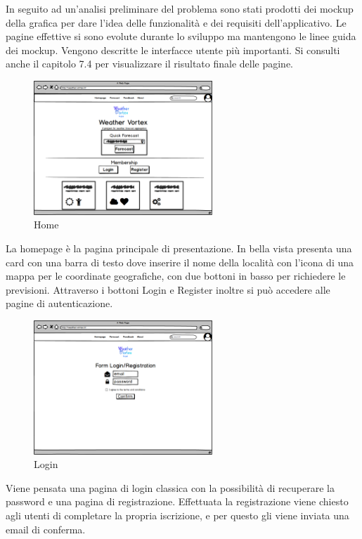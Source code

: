 In seguito ad un'analisi preliminare del problema sono stati prodotti dei mockup
della grafica per dare l'idea delle funzionalità e dei requisiti dell'applicativo. Le
pagine effettive si sono evolute durante lo sviluppo ma mantengono le linee guida
dei mockup. 
Vengono descritte le interfacce utente più importanti.
Si consulti anche il capitolo 7.4 per visualizzare il risultato finale delle pagine.
\begin{figure}[H]
    \caption{Home}
    \label{fig:Home}
    \centering
    \includegraphics[width=0.6\textwidth]{MockUps/homepage.png}
\end{figure}
La homepage è la pagina principale di presentazione.
In bella vista presenta una card con una barra di testo dove inserire il nome della località con l'icona di una mappa per le coordinate geografiche, con due bottoni in basso per richiedere le previsioni. 
Attraverso i bottoni Login e Register inoltre si può accedere alle pagine di autenticazione.
\begin{figure}[H]
    \caption{Login}
    \label{fig:Login}
    \centering
    \includegraphics[width=0.6\textwidth]{MockUps/Login_Register.png}
\end{figure}

Viene pensata una pagina di login classica con la possibilità di recuperare la password e una pagina di registrazione. Effettuata la registrazione viene chiesto agli utenti di completare la propria iscrizione, e per questo gli viene inviata una email di conferma.

